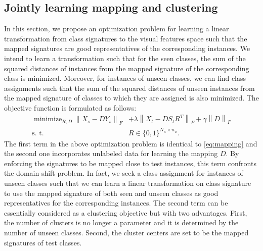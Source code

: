 \documentclass[10pt,twocolumn,letterpaper]{article}
\newcommand{\norm}[1]{\left \lVert #1 \right \rVert_{F}}
\DeclareMathOperator*{\minimize}{minimize}
\begin{document}
\subsection{Jointly learning mapping and clustering}
\label{joint}
 In this section, we propose an optimization problem for learning a linear transformation from class signatures to the visual features space such that the mapped signatures are good representatives of the corresponding instances.
 We intend to learn a transformation such that for the seen classes, the sum of the squared distances of instances from the mapped signature of the corresponding class is minimized. Moreover, for instances of unseen classes, we can find class assignments such that the sum of the squared distances of unseen instances from the mapped signature of classes to which they are assigned is also minimized.
 The objective function is formulated as follows:
 \begin{align} \label{eq:main}
   \minimize_{R,D} \norm{X_s - D Y_s}  &+ \lambda \norm{X_t - D S_t R^T } + \gamma \norm{D} \\
   \text{s. t.} \quad & R \in \{0,1\}^{N_u \times n_u}. \nonumber
 \end{align}
The first term in the above optimization problem is identical to \eqref{eq:mapping} and the second one incorporates unlabeled data for learning the mapping $D$. By enforcing
 the signatures to be mapped close to test instances, this term confronts the domain shift problem. In fact, we seek a class assignment for instances of unseen classes such that we can learn a linear transformation on class signature to use the mapped signature of both seen and unseen classes as good representatives for the corresponding instances.
 The second term can be essentially considered as a clustering objective but with two advantages. First, the number of clusters is no longer a
 parameter and it is determined by the number of unseen classes. Second, the cluster centers are set to be the mapped signatures of test classes.
\end{document}

